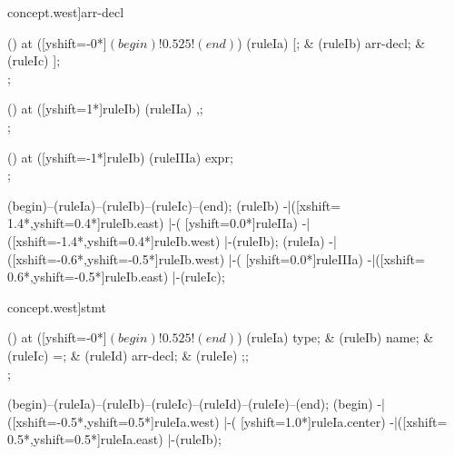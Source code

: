 \begin{syntax}[[xshift=22mm]concept.west]{arr-decl}
  
  \node[sequence,column sep=2.0cm] () at ([yshift=-0*\syntaxruledist]$(begin)!0.525!(end)$) {
    \node[terminal]       (ruleIa) {[};
    &
    \node[nonterminal]    (ruleIb) {arr-decl};
    &
    \node[terminal]       (ruleIc) {]};
    \\
  };
  
  \node[sequence] () at ([yshift=1*\syntaxruledist]ruleIb) {
    \node[terminal]    (ruleIIa) {,};
    \\
  };
  
  \node[sequence] () at ([yshift=-1*\syntaxruledist]ruleIb) {
    \node[nonterminal]    (ruleIIIa) {expr};
    \\
  };
  
  \draw[path] (begin)--(ruleIa)--(ruleIb)--(ruleIc)--(end);
  \draw[path] (ruleIb)
            -|([xshift= 1.4*\syntaxruledist,yshift=0.4*\syntaxruledist]ruleIb.east)
            |-(                            [yshift=0.0*\syntaxruledist]ruleIIa)
            -|([xshift=-1.4*\syntaxruledist,yshift=0.4*\syntaxruledist]ruleIb.west)
            |-(ruleIb);
  \draw[path] (ruleIa)
            -|([xshift=-0.6*\syntaxruledist,yshift=-0.5*\syntaxruledist]ruleIb.west)
            |-(                            [yshift=0.0*\syntaxruledist]ruleIIIa)
            -|([xshift= 0.6*\syntaxruledist,yshift=-0.5*\syntaxruledist]ruleIb.east)
            |-(ruleIc);
\end{syntax}

\begin{syntax}[[xshift=22mm]concept.west]{stmt}
  
  \node[sequence,column sep=1.0cm] () at ([yshift=-0*\syntaxruledist]$(begin)!0.525!(end)$) {
    \node[nonterminal]    (ruleIa) {type};
    &
    \node[terminal]       (ruleIb) {name};
    &
    \node[terminal]       (ruleIc) {=};
    &
    \node[nonterminal]    (ruleId) {arr-decl};
    &
    \node[terminal]       (ruleIe) {;};
    \\
  };
  
  \draw[path] (begin)--(ruleIa)--(ruleIb)--(ruleIc)--(ruleId)--(ruleIe)--(end);
  \draw[path] (begin)
            -|([xshift=-0.5*\syntaxruledist,yshift=0.5*\syntaxruledist]ruleIa.west)
            |-(                            [yshift=1.0*\syntaxruledist]ruleIa.center)
            -|([xshift= 0.5*\syntaxruledist,yshift=0.5*\syntaxruledist]ruleIa.east)
            |-(ruleIb);
\end{syntax}

